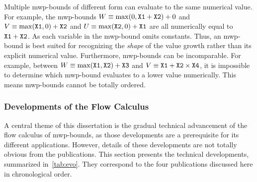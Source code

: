 \noindent Multiple mwp-bounds of different form can evaluate to the same numerical value.
For example, the mwp-bounds
\(W \equiv \max(0,\prm{X1}+\prm{X2})+0\) and
\(V \equiv \max(\prm{X1},0)+\prm{X2}\) and
\(U \equiv \max(\prm{X2},0)+\prm{X1}\) are all numerically equal to \(\prm{X1}+\prm{X2}\).
As each variable in the mwp-bound omits constants.
Thus, an mwp-bound is best suited for recognizing the \emph{shape} of the value growth rather than its explicit numerical value.
Furthermore, mwp-bounds can be incomparable.
For example, between \(W \equiv \max(\prm{X1},\prm{X2})+\prm{X3}\) and \(V \equiv \prm{X1}+\prm{X2}\times\prm{X4}\), it is impossible to determine which mwp-bound evaluates to a lower value numerically.
This means mwp-bounds cannot be totally ordered.

\subsubsection{Developments of the Flow Calculus}

A central theme of this dissertation is the gradual technical advancement of the flow calculus of mwp-bounds, as those developments are a prerequisite for its different applications.
However, details of these developments are not totally obvious from the publications.
This section presents the technical developments, summarized in~\autoref{tab:evo}.
They correspond to the four publications discussed here in chronological order.

